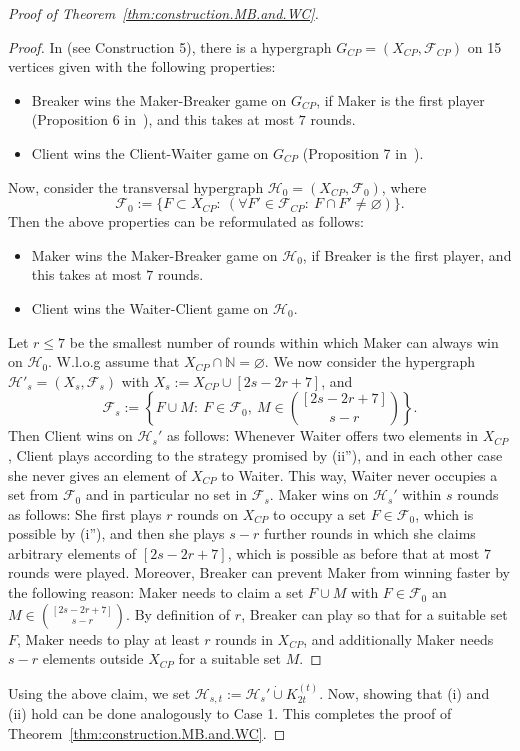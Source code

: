 \documentclass[reqno, 12pt]{amsart}
\numberwithin{equation}{section}
\numberwithin{figure}{section}
\newcommand{\calH}{\mathcal{H}}
\newcommand{\calF}{\mathcal{F}}
\begin{document}
\begin{proof}[Proof of Theorem~\ref{thm:construction.MB.and.WC}]
\begin{proof}
In \cite{knox2012two} (see Construction 5),
there is a hypergraph $G_{CP} = (X_{CP},\calF_{CP})$ on 15 vertices given
with the following properties:
\begin{itemize}
\item[(i')] Breaker wins the Maker-Breaker game on $G_{CP}$,
if Maker is the first player (Proposition 6 in~\cite{knox2012two}), and this takes at most $7$ rounds.
\item[(ii')] Client wins the Client-Waiter game on $G_{CP}$
(Proposition 7 in~\cite{knox2012two}).
\end{itemize}
Now, consider the transversal hypergraph $\calH_0 = (X_{CP},\calF_0)$, where
$$\calF_0:=\{F\subset X_{CP}:~ (\forall F'\in \calF_{CP}:~ F\cap F'\neq \varnothing)\}.$$
Then the above properties can be reformulated as follows:
\begin{itemize}
\item[(i'')] Maker wins the Maker-Breaker game on $\calH_0$,
if Breaker is the first player, and this takes at most $7$ rounds.
\item[(ii'')] Client wins the Waiter-Client game on $\calH_0$.
\end{itemize}
Let $r\leq 7$ be the smallest number of rounds within which
Maker can always win on $\calH_0$.
W.l.o.g assume that $X_{CP}\cap \mathbb{N}=\varnothing$.
We now consider the hypergraph $\calH'_s =(X_s,\calF_s)$ 
with $X_s := X_{CP} \cup [2s - 2r + 7]$, and
$$
\calF_s :=
\left\{ F\cup M:~ F\in \calF_0,~ M\in \binom{[2s-2r+7]}{s-r} \right\}. 
$$
Then Client wins on $\calH_s'$ as follows:
Whenever Waiter offers two elements in $X_{CP}$,
Client plays according to the strategy promised by (ii''),
and in each other case she never gives an element of $X_{CP}$
to Waiter. This way, Waiter never occupies a set from
$\calF_0$ and in particular no set in $\calF_s$.
Maker wins on $\calH_s'$ within $s$ rounds as follows:
She first plays $r$ rounds on $X_{CP}$ to occupy a
set $F\in \calF_0$, which is possible by (i''),
and then she plays $s-r$ further rounds in which she claims
arbitrary elements of $[2s-2r+7]$, which is possible as before that at most $7$ rounds were played.
Moreover, Breaker can prevent Maker from winning faster by
the following reason: Maker needs to claim a set
$F\cup M$ with $F\in \calF_0$ an $M\in \binom{[2s-2r+7]}{s-r}$.
By definition of $r$, 
Breaker can play so that for a suitable set $F$,
Maker needs to play at least $r$ rounds in $X_{CP}$,
and additionally Maker needs $s-r$ elements outside $X_{CP}$ for a suitable set $M$. 
\end{proof}

Using the above claim, we set 
$\calH_{s,t} := \calH_s' \dot\cup K_{2t}^{(t)}$.
Now, showing that (i) and (ii) hold can be done analogously 
to Case 1.
This completes the proof of Theorem~\ref{thm:construction.MB.and.WC}. 
\end{proof}
\end{document}
